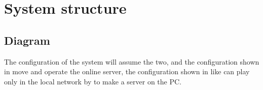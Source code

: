 \newpage
\section{System structure}
\subsection{Diagram}
The configuration of the system will assume the two, and the configuration shown in  move and operate the online server, the configuration shown in  like can play only in the local network by to make a server on the PC.

